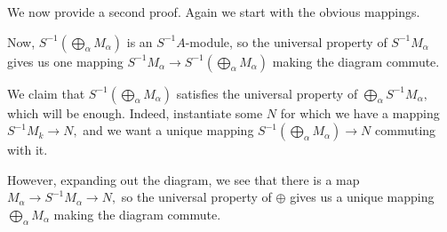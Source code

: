 We now provide a second proof. Again we start with the obvious mappings.
\begin{center}
\end{center}
Now, $S^{-1}\left(\bigoplus_\alpha M_\alpha\right)$ is an $S^{-1}A$-module, so the universal property of $S^{-1}M_\alpha$ gives us one mapping $S^{-1}M_\alpha\to S^{-1}\left(\bigoplus_\alpha M_\alpha\right)$ making the diagram commute.
\begin{center}
\end{center}
We claim that $S^{-1}\left(\bigoplus_\alpha M_\alpha\right)$ satisfies the universal property of $\bigoplus_\alpha S^{-1}M_\alpha,$ which will be enough. Indeed, instantiate some $N$ for which we have a mapping $S^{-1}M_k\to N,$ and we want a unique mapping $S^{-1}\left(\bigoplus_\alpha M_\alpha\right)\to N$ commuting with it.
\begin{center}
\end{center}
However, expanding out the diagram, we see that there is a map $M_\alpha\to S^{-1}M_\alpha\to N,$ so the universal property of $\oplus$ gives us a unique mapping $\bigoplus_\alpha M_\alpha$ making the diagram commute.
\begin{center}
\end{center}
